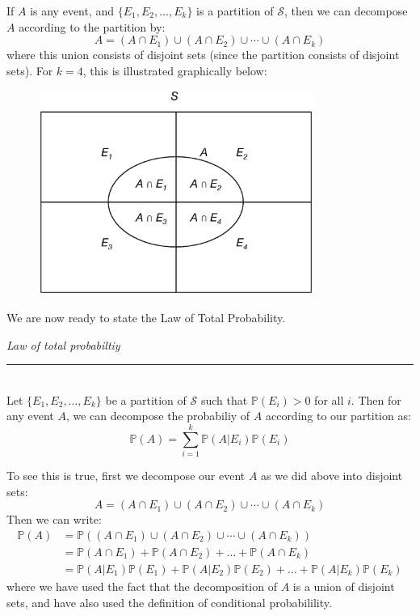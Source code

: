 \documentclass[12pt]{article}
\theoremstyle{definition}
\theoremstyle{remark}
\def\P{{\mathbb P}}
\def\cals{{\mathcal S}}
\begin{document}
If $A$ is any event, and $\{E_1, E_2, \dots, E_k\}$ is a partition of $\cals$, then we can decompose $A$ according to the partition by:
\[
A = (A \cap E_1) \cup (A \cap E_2) \cup \cdots \cup (A \cap E_k)
\]
where this union consists of disjoint sets (since the partition consists of disjoint sets). For $k = 4$, this is illustrated graphically below:
\begin{figure}[H]
\centering
\includegraphics[width=9cm]{partition2.eps}
\end{figure}

We are now ready to state the Law of Total Probability.

\begin{framed}
\emph{Law of total probabiltiy}\\
  \rule{\dimexpr{}\fboxrule}{.1pt} \\
Let $\{E_1, E_2, \dots, E_k\}$ be a partition of $\cals$ such that $\P(E_i) > 0$ for all $i$. Then for any event $A$, we can decompose the probabiliy of $A$ according to our partition as:
\[
\P(A) = \sum_{i = 1}^k \P(A|E_i)\P(E_i)
\]
\end{framed}
To see this is true, first we decompose our event $A$ as we did above into disjoint sets:
\[
A = (A \cap E_1) \cup (A \cap E_2) \cup \cdots \cup (A \cap E_k)
\]
Then we can write:
\begin{align*}
\P(A) &= \P( (A \cap E_1) \cup (A \cap E_2) \cup \cdots \cup (A \cap E_k) ) \\
&= \P(A \cap E_1) + \P(A \cap E_2) + \dots + \P(A \cap E_k) \\
&= \P(A|E_1)\P(E_1) + \P(A|E_2)\P(E_2) + \dots + \P(A|E_k)\P(E_k) 
\end{align*}
where we have used the fact that the decomposition of $A$ is a union of disjoint sets, and have also used the definition of conditional probabilility.\\
\end{document}
